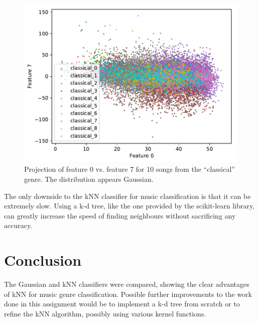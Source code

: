 \documentclass[a4paper,titlepage]{article}
\begin{document}
	\begin{figure}[!htb]
	\centering
	\includegraphics[width=\columnwidth]{plots/classical_gaussian.pdf}
	\caption
	{Projection of feature 0 vs. feature 7 for 10 songs from the ``classical'' genre. The distribution appears Gaussian.}
	\label{fig:classical_gaussian}
	\end{figure}
	
	The only downside to the kNN classifier for music classification is that it can be extremely slow. Using a k-d tree, like the one provided by the scikit-learn library, can greatly increase the speed of finding neighbours without sacrificing any accuracy.

	\section*{Conclusion}
	
	The Gaussian and kNN classifiers were compared, showing the clear advantages of kNN for music genre classification. Possible further improvements to the work done in this assignment would be to implement a k-d tree from scratch or to refine the kNN algorithm, possibly using various kernel functions.
	
	
	
\end{document}
